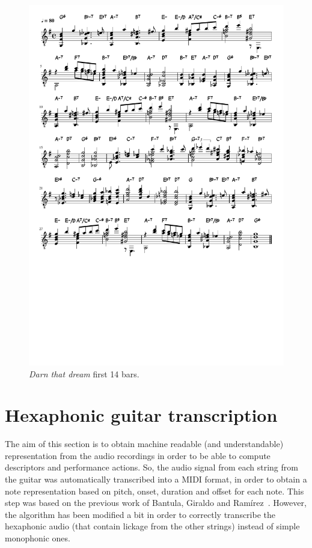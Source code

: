 \begin{figure}[ht!]
    \centering
    \caption{\textit{Darn that dream} first 14 bars.}
    \label{fig:darn_score}
    
        \includegraphics[clip, trim=0cm 19cm 0cm 0cm, width=\textwidth]{Figures/Darn_that_dream.pdf}
    
\end{figure}

\section{Hexaphonic guitar transcription}
The aim of this section is to obtain machine readable (and understandable) representation from the audio recordings in order to be able to compute descriptors and performance actions. So, the audio signal from each string from the guitar was automatically transcribed into a MIDI format, in order to obtain a note representation based on pitch, onset, duration and offset for each note. This step was based on the previous work of Bantula, Giraldo and Ramírez~\cite{bantula2016}. However, the algorithm has been modified a bit in order to correctly transcribe the hexaphonic audio (that contain lickage from the other strings) instead of simple monophonic ones.

